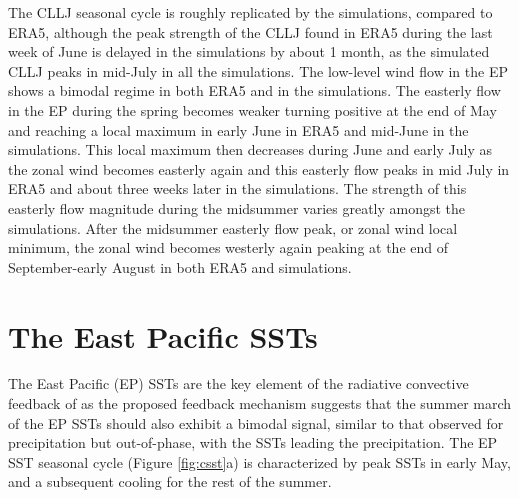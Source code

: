 The CLLJ seasonal cycle is roughly replicated by the simulations, compared to ERA5, although the peak strength of the CLLJ found in ERA5 during the last week of June is delayed in the simulations by about 1 month, as the simulated CLLJ peaks in mid-July in all the simulations.
The low-level wind flow in the EP shows a bimodal regime in both ERA5 and in the simulations. 
The easterly flow in the EP during the spring becomes weaker turning positive at the end of May and reaching a local maximum in early June in ERA5 and mid-June in the simulations. This local maximum then decreases during June and early July as the zonal wind becomes easterly again and this easterly flow peaks in mid July in ERA5 and about three weeks later in the simulations. The strength of this easterly flow magnitude during the midsummer varies greatly amongst the simulations. 
After the midsummer easterly flow peak, or zonal wind local minimum, the zonal wind becomes westerly again peaking at the end of September-early August in both ERA5 and simulations. 










\section{The East Pacific SSTs}

 

The East Pacific (EP) SSTs are the key element of the radiative convective feedback of \cite{magana1999} as the proposed feedback mechanism suggests that the summer march of the EP SSTs should also exhibit a bimodal signal, similar to that observed for precipitation but out-of-phase, with the SSTs leading the precipitation.
The EP SST seasonal cycle (Figure \ref{fig:csst}a) is characterized by peak SSTs in early May, and a subsequent cooling for the rest of the summer. 

